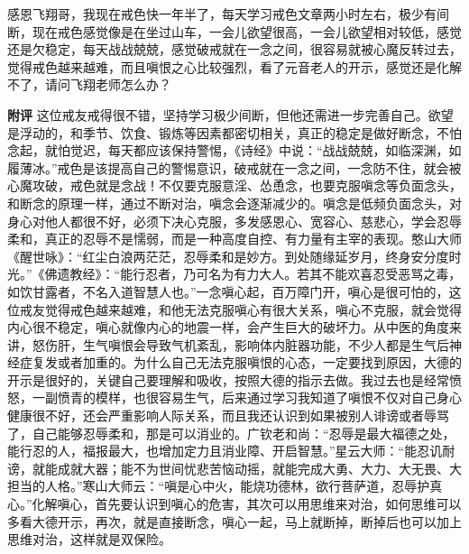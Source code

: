 \begin{case}
    感恩飞翔哥，我现在戒色快一年半了，每天学习戒色文章两小时左右，极少有间断，现在戒色感觉像是在坐过山车，一会儿欲望很高，一会儿欲望相对较低，感觉还是欠稳定，每天战战兢兢，感觉破戒就在一念之间，很容易就被心魔反转过去，觉得戒色越来越难，而且嗔恨之心比较强烈，看了元音老人的开示，感觉还是化解不了，请问飞翔老师怎么办？

    \textbf{附评} 这位戒友戒得很不错，坚持学习极少间断，但他还需进一步完善自己。欲望是浮动的，和季节、饮食、锻炼等因素都密切相关，真正的稳定是做好断念，不怕念起，就怕觉迟，每天都应该保持警惕，《诗经》中说：“战战兢兢，如临深渊，如履薄冰。”戒色是该提高自己的警惕意识，破戒就在一念之间，一念防不住，就会被心魔攻破，戒色就是念战！不仅要克服意淫、怂恿念，也要克服嗔念等负面念头，和断念的原理一样，通过不断对治，嗔念会逐渐减少的。嗔念是低频负面念头，对身心对他人都很不好，必须下决心克服，多发感恩心、宽容心、慈悲心，学会忍辱柔和，真正的忍辱不是懦弱，而是一种高度自控、有力量有主宰的表现。憨山大师《醒世咏》：“红尘白浪两茫茫，忍辱柔和是妙方。到处随缘延岁月，终身安分度时光。”《佛遗教经》：“能行忍者，乃可名为有力大人。若其不能欢喜忍受恶骂之毒，如饮甘露者，不名入道智慧人也。”一念嗔心起，百万障门开，嗔心是很可怕的，这位戒友觉得戒色越来越难，和他无法克服嗔心有很大关系，嗔心不克服，就会觉得内心很不稳定，嗔心就像内心的地震一样，会产生巨大的破坏力。从中医的角度来讲，怒伤肝，生气嗔恨会导致气机紊乱，影响体内脏器功能，不少人都是生气后神经症复发或者加重的。为什么自己无法克服嗔恨的心态，一定要找到原因，大德的开示是很好的，关键自己要理解和吸收，按照大德的指示去做。我过去也是经常愤怒，一副愤青的模样，也很容易生气，后来通过学习我知道了嗔恨不仅对自己身心健康很不好，还会严重影响人际关系，而且我还认识到如果被别人诽谤或者辱骂了，自己能够忍辱柔和，那是可以消业的。广钦老和尚：“忍辱是最大福德之处，能行忍的人，福报最大，也增加定力且消业障、开启智慧。”星云大师：“能忍讥耐谤，就能成就大器；能不为世间忧悲苦恼动摇，就能完成大勇、大力、大无畏、大担当的人格。”寒山大师云：“嗔是心中火，能烧功德林，欲行菩萨道，忍辱护真心。”化解嗔心，首先要认识到嗔心的危害，其次可以用思维来对治，如何思维可以多看大德开示，再次，就是直接断念，嗔心一起，马上就断掉，断掉后也可以加上思维对治，这样就是双保险。
\end{case}

